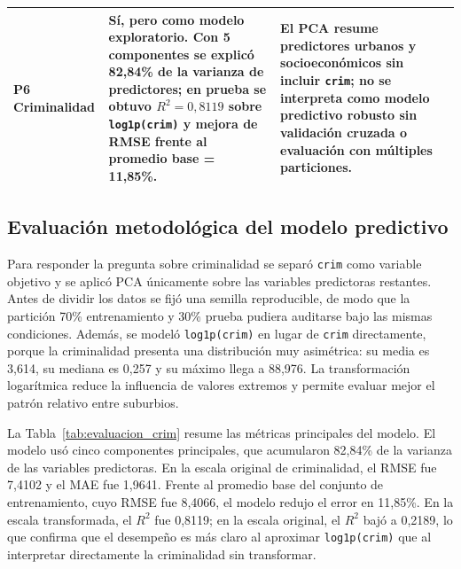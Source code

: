 \documentclass[10pt,a4paper]{article}
\begin{document}
\begin{table}[H]
\begin{tabularx}{\textwidth}{p{2.2cm} X X}
    P6 Criminalidad & Sí, pero como modelo exploratorio. Con 5 componentes se explicó 82,84\% de la varianza de predictores; en prueba se obtuvo $R^{2} = 0,8119$ sobre \texttt{log1p(crim)} y mejora de RMSE frente al promedio base = 11,85\%. & El PCA resume predictores urbanos y socioeconómicos sin incluir \texttt{crim}; no se interpreta como modelo predictivo robusto sin validación cruzada o evaluación con múltiples particiones. \\
    \bottomrule
  \end{tabularx}
\end{table}

\subsection{Evaluación metodológica del modelo predictivo}

Para responder la pregunta sobre criminalidad se separó \texttt{crim} como variable objetivo y se aplicó PCA únicamente sobre las variables predictoras restantes. Antes de dividir los datos se fijó una semilla reproducible, de modo que la partición 70\% entrenamiento y 30\% prueba pudiera auditarse bajo las mismas condiciones. Además, se modeló \texttt{log1p(crim)} en lugar de \texttt{crim} directamente, porque la criminalidad presenta una distribución muy asimétrica: su media es 3,614, su mediana es 0,257 y su máximo llega a 88,976. La transformación logarítmica reduce la influencia de valores extremos y permite evaluar mejor el patrón relativo entre suburbios.

La Tabla~\ref{tab:evaluacion_crim} resume las métricas principales del modelo. El modelo usó cinco componentes principales, que acumularon 82,84\% de la varianza de las variables predictoras. En la escala original de criminalidad, el RMSE fue 7,4102 y el MAE fue 1,9641. Frente al promedio base del conjunto de entrenamiento, cuyo RMSE fue 8,4066, el modelo redujo el error en 11,85\%. En la escala transformada, el $R^{2}$ fue 0,8119; en la escala original, el $R^{2}$ bajó a 0,2189, lo que confirma que el desempeño es más claro al aproximar \texttt{log1p(crim)} que al interpretar directamente la criminalidad sin transformar.
\end{document}
